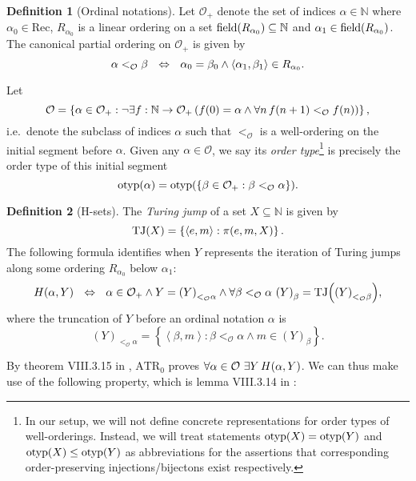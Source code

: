 \documentclass[11pt]{article}
\theoremstyle{plain}
\theoremstyle{definition}
\newtheorem*{definition}{Definition}
\newcommand{\tuple}[1]{\left\langle #1 \right\rangle}
\newcommand{\Rec}{\mathrm{Rec}}
\DeclareMathOperator{\field}{field}
\DeclareMathOperator{\otyp}{otyp}
\DeclareMathOperator{\TJ}{TJ}
\begin{document}
\begin{definition}[Ordinal notations]
    Let $\mathcal{O}_+$ denote the set of indices $\alpha \in \mathbb{N}$ where $\alpha_0 \in \Rec$, $R_{\alpha_0}$ is a linear ordering on a set $\field\mleft(R_{\alpha_0}\mright) \subseteq \mathbb{N}$ and $\alpha_1 \in \field\mleft(R_{\alpha_0}\mright)$. The canonical partial ordering on $\mathcal{O}_+$ is given by
    \[\alpha <_\mathcal{O} \beta \ \ \ratio\Leftrightarrow \ \ \alpha_0 = \beta_0 \land \tuple{\alpha_1, \beta_1} \in R_{\alpha_0}.\]

    Let
    \[\mathcal{O} = \left\{\alpha \in \mathcal{O}_+ : \neg \exists f : \mathbb{N} \rightarrow \mathcal{O}_+ \left(f\mleft(0\mright) = \alpha \land \forall n \, f\mleft(n + 1\mright) <_\mathcal{O} f\mleft(n\mright)\right)\right\},\]
    i.e.\ denote the subclass of indices $\alpha$ such that $<_\mathcal{O}$ is a well-ordering on the initial segment before $\alpha$. Given any $\alpha \in \mathcal{O}$, we say its \emph{order type}\footnote{In our setup, we will not define concrete representations for order types of well-orderings. Instead, we will treat statements $\otyp\mleft(X\mright) = \otyp\mleft(Y\mright)$ and $\otyp\mleft(X\mright) \leq \otyp\mleft(Y\mright)$ as abbreviations for the assertions that corresponding order-preserving injections/bijectons exist respectively.} is precisely the order type of this initial segment
    \[\otyp\mleft(\alpha\mright) = \otyp\mleft(\left\{\beta \in \mathcal{O}_+ : \beta <_\mathcal{O} \alpha\right\}\mright).\]
\end{definition}

\begin{definition}[$\mathrm{H}$-sets]
    The \emph{Turing jump} of a set $X \subseteq \mathbb{N}$ is given by
    \[\TJ\mleft(X\mright) = \left\{\tuple{e, m} : \pi\mleft(e, m, X\mright)\right\}.\]
    The following formula identifies when $Y$ represents the iteration of Turing jumps along some ordering $R_{\alpha_0}$ below $\alpha_1$:
    \[H\mleft(\alpha, Y\mright) \ \ \ratio\Leftrightarrow \ \ \alpha \in \mathcal{O}_+ \land Y = \left(Y\right)_{<_\mathcal{O} \alpha} \land \forall \beta <_\mathcal{O} \alpha \, \left(Y\right)_\beta = \TJ\mleft(\left(Y\right)_{<_\mathcal{O} \beta}\mright),\]
    where the truncation of $Y$ before an ordinal notation $\alpha$ is
    \[\left(Y\right)_{<_\mathcal{O} \alpha} = \left\{\tuple{\beta, m} : \beta <_\mathcal{O} \alpha \land m \in \left(Y\right)_{\beta}\right\}.\]
\end{definition}

By theorem VIII.3.15 in \cite{simpson09-soa}, $\mathrm{ATR}_0$ proves $\forall \alpha \in \mathcal{O} \ \exists Y \, H\mleft(\alpha, Y\mright)$. We can thus make use of the following property, which is lemma VIII.3.14 in \cite{simpson09-soa}:
\end{document}
